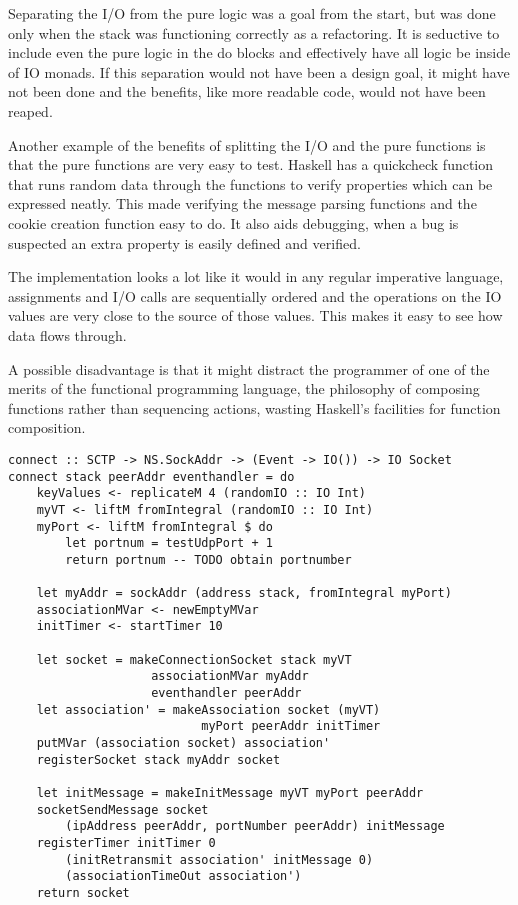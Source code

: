 
Separating the I/O from the pure logic was a goal from the start, but was done only when the stack was functioning correctly as a refactoring. It is seductive to include even the pure logic in the do blocks and effectively have all logic be inside of IO monads. If this separation would not have been a design goal, it might have not been done and the benefits, like more readable code,  would not have been reaped.

Another example of the benefits of splitting the I/O and the pure functions is that the pure functions are very easy to test. Haskell has a quickcheck\cite{Claessen_2000} function that runs random data through the functions to verify properties which can be expressed neatly. This made verifying the message parsing functions and the cookie creation function easy to do. It also aids debugging, when a bug is suspected an extra property is easily defined and verified.


The implementation looks a lot like it would in any regular imperative language, assignments and I/O calls are sequentially ordered and the operations on the IO values are very close to the source of those values. This makes it easy to see how data flows through.

A possible disadvantage is that it might distract the programmer of one of the merits of the functional programming language, the philosophy of composing functions rather than sequencing actions, wasting Haskell's facilities for function composition. 

\begin{lstlisting}[caption={The connect function looks imperative}]
connect :: SCTP -> NS.SockAddr -> (Event -> IO()) -> IO Socket
connect stack peerAddr eventhandler = do
    keyValues <- replicateM 4 (randomIO :: IO Int)
    myVT <- liftM fromIntegral (randomIO :: IO Int)
    myPort <- liftM fromIntegral $ do 
        let portnum = testUdpPort + 1
        return portnum -- TODO obtain portnumber

    let myAddr = sockAddr (address stack, fromIntegral myPort)
    associationMVar <- newEmptyMVar
    initTimer <- startTimer 10

    let socket = makeConnectionSocket stack myVT
                    associationMVar myAddr
                    eventhandler peerAddr
    let association' = makeAssociation socket (myVT) 
                           myPort peerAddr initTimer
    putMVar (association socket) association'
    registerSocket stack myAddr socket

    let initMessage = makeInitMessage myVT myPort peerAddr
    socketSendMessage socket 
        (ipAddress peerAddr, portNumber peerAddr) initMessage
    registerTimer initTimer 0 
        (initRetransmit association' initMessage 0)
        (associationTimeOut association')
    return socket
\end{lstlisting}


